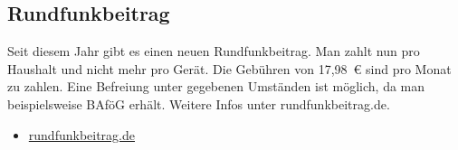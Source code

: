 

\subsection{Rundfunkbeitrag}
Seit diesem Jahr gibt es einen neuen Rundfunkbeitrag. Man zahlt nun pro Haushalt und nicht mehr pro Gerät. Die Gebühren von 17,98~€ sind pro Monat zu zahlen. Eine Befreiung unter gegebenen Umständen ist möglich, da man beispielsweise BAföG erhält. Weitere Infos unter rundfunkbeitrag.de.
\begin{itemize}
    \item \url{rundfunkbeitrag.de}
\end{itemize}

